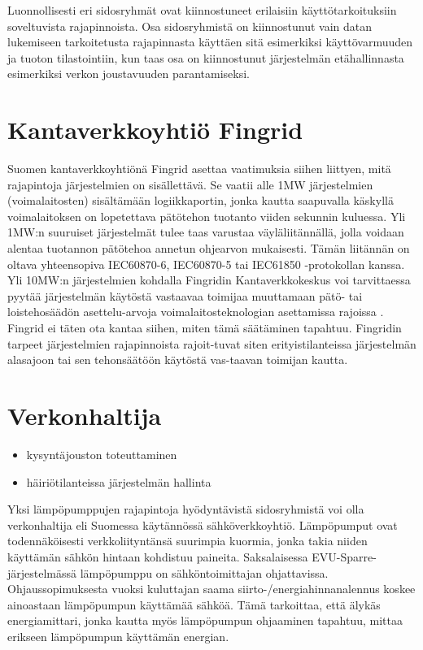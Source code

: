 Luonnollisesti eri sidosryhmät ovat kiinnostuneet erilaisiin käyttötarkoituksiin soveltuvista rajapinnoista. Osa sidosryhmistä on kiinnostunut vain datan lukemiseen tarkoitetusta rajapinnasta käyttäen sitä esimerkiksi käyttövarmuuden ja tuoton tilastointiin, kun taas osa on kiinnostunut järjestelmän etähallinnasta esimerkiksi verkon joustavuuden parantamiseksi.

\section{Kantaverkkoyhtiö Fingrid}
  Suomen kantaverkkoyhtiönä Fingrid asettaa vaatimuksia siihen liittyen, mitä rajapintoja järjestelmien on sisällettävä. Se vaatii alle 1MW järjestelmien (voimalaitosten) sisältämään logiikkaportin, jonka kautta saapuvalla käskyllä voimalaitoksen on lopetettava pätötehon tuotanto viiden sekunnin kuluessa. Yli 1MW:n suuruiset järjestelmät tulee taas varustaa väyläliitännällä, jolla voidaan alentaa tuotannon pätötehoa annetun ohjearvon mukaisesti. Tämän liitännän on oltava yhteensopiva IEC60870-6, IEC60870-5 tai IEC61850 -protokollan kanssa. \parencite{VJV2018}
  Yli 10MW:n järjestelmien kohdalla Fingridin Kantaverkkokeskus voi tarvittaessa pyytää järjestelmän käytöstä vastaavaa toimijaa muuttamaan pätö- tai loistehosäädön asettelu-arvoja voimalaitosteknologian asettamissa rajoissa \parencite{VJV2018}. Fingrid ei täten ota kantaa siihen, miten tämä säätäminen tapahtuu. Fingridin tarpeet järjestelmien rajapinnoista rajoit-tuvat siten erityistilanteissa järjestelmän alasajoon tai sen tehonsäätöön käytöstä vas-taavan toimijan kautta.

\section{Verkonhaltija}
  \begin{itemize}
    \item kysyntäjouston toteuttaminen
    \item häiriötilanteissa järjestelmän hallinta
  \end{itemize}

  Yksi lämpöpumppujen rajapintoja hyödyntävistä sidosryhmistä voi olla verkonhaltija eli Suomessa käytännössä sähköverkkoyhtiö. Lämpöpumput ovat todennäköisesti verkkoliityntänsä suurimpia kuormia, jonka takia niiden käyttämän sähkön hintaan kohdistuu paineita. Saksalaisessa EVU-Sparre-järjestelmässä lämpöpumppu on sähköntoimittajan ohjattavissa. Ohjaussopimuksesta vuoksi kuluttajan saama siirto-/energiahinnanalennus koskee ainoastaan lämpöpumpun käyttämää sähköä. Tämä tarkoittaa, että älykäs energiamittari, jonka kautta myös lämpöpumpun ohjaaminen tapahtuu, mittaa erikseen lämpöpumpun käyttämän energian.


